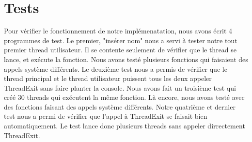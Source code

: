 \documentclass[12pt]{article}
\begin{document}
\section {Tests}

Pour vérifier le fonctionnement de notre implémenatation, nous avons écrit 4 programmes de test.
Le premier, "insérer nom" nous a servi à tester notre tout premier thread utilisateur. Il se contente seulement de vérifier que le thread se lance, et exécute la fonction. Nous avons testé plusieurs fonctions qui faisaient des appels système différents.
Le deuxième test nous a permis de vérifier que le thread principal et le thread utilisateur puissent tous les deux appeler ThreadExit sans faire planter la console.
Nous avons fait un troisième test qui créé 30 threads qui exécutent la même fonction. Là encore, nous avons testé avec des fonctions faisant des appels système différents.
Notre quatrième et dernier test nous a permi de vérifier que l'appel à ThreadExit se faisait bien automatiquement. Le test lance donc plusieurs threads sans appeler dirrectement ThreadExit.
\end{document}
